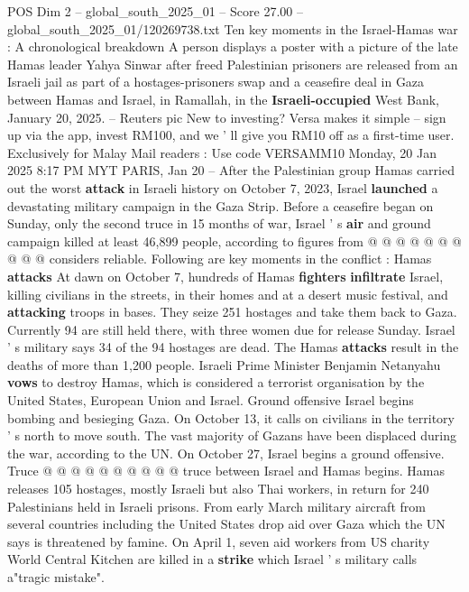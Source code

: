 \begin{textsample}{POS Dim 2 – global\_south\_2025\_01 – Score 27.00 – global\_south\_2025\_01/120269738.txt}  \label{ex:f2_pos_323}
Ten key moments in the Israel-Hamas war : A chronological breakdown A person displays a poster with a picture of the late Hamas leader Yahya Sinwar after freed Palestinian prisoners are released from an Israeli jail as part of a hostages-prisoners swap and a ceasefire deal in Gaza between Hamas and Israel, in Ramallah, in the \textbf{Israeli-occupied} West Bank, January 20, 2025. -- Reuters pic New to investing?
Versa makes it simple -- sign up via the app, invest RM100, and we ' ll give you RM10 off as a first-time user.
Exclusively for Malay Mail readers : Use code VERSAMM10 Monday, 20 Jan 2025 8:17 PM MYT PARIS, Jan 20 -- After the Palestinian group Hamas carried out the worst \textbf{attack} in Israeli history on October 7, 2023, Israel \textbf{launched} a devastating military campaign in the Gaza Strip.
Before a ceasefire began on Sunday, only the second truce in 15 months of war, Israel ' s \textbf{air} and ground campaign killed at least 46,899 people, according to figures from @ @ @ @ @ @ @ @ @ @ considers reliable.
Following are key moments in the conflict : Hamas \textbf{attacks} At dawn on October 7, hundreds of Hamas \textbf{fighters} \textbf{infiltrate} Israel, killing civilians in the streets, in their homes and at a desert music festival, and \textbf{attacking} troops in bases.
They seize 251 hostages and take them back to Gaza.
Currently 94 are still held there, with three women due for release Sunday.
Israel ' s military says 34 of the 94 hostages are dead.
The Hamas \textbf{attacks} result in the deaths of more than 1,200 people.
Israeli Prime Minister Benjamin Netanyahu \textbf{vows} to destroy Hamas, which is considered a terrorist organisation by the United States, European Union and Israel.
Ground offensive Israel begins bombing and besieging Gaza.
On October 13, it calls on civilians in the territory ' s north to move south.
The vast majority of Gazans have been displaced during the war, according to the UN.
On October 27, Israel begins a ground offensive.
Truce @ @ @ @ @ @ @ @ @ @ truce between Israel and Hamas begins.
Hamas releases 105 hostages, mostly Israeli but also Thai workers, in return for 240 Palestinians held in Israeli prisons.
From early March military aircraft from several countries including the United States drop aid over Gaza which the UN says is threatened by famine.
On April 1, seven aid workers from US charity World Central Kitchen are killed in a \textbf{strike} which Israel ' s military calls a"tragic mistake".

\end{textsample}
